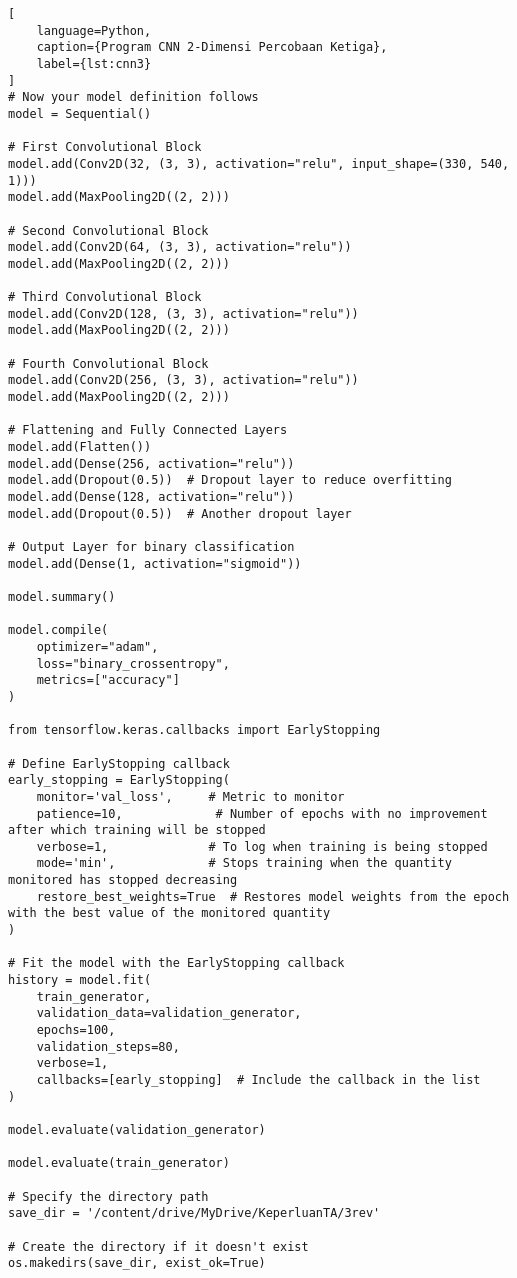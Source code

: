 \begin{lstlisting}[
    language=Python,
    caption={Program CNN 2-Dimensi Percobaan Ketiga},
    label={lst:cnn3}
]
# Now your model definition follows
model = Sequential()

# First Convolutional Block
model.add(Conv2D(32, (3, 3), activation="relu", input_shape=(330, 540, 1)))
model.add(MaxPooling2D((2, 2)))

# Second Convolutional Block
model.add(Conv2D(64, (3, 3), activation="relu"))
model.add(MaxPooling2D((2, 2)))

# Third Convolutional Block
model.add(Conv2D(128, (3, 3), activation="relu"))
model.add(MaxPooling2D((2, 2)))

# Fourth Convolutional Block
model.add(Conv2D(256, (3, 3), activation="relu"))
model.add(MaxPooling2D((2, 2)))

# Flattening and Fully Connected Layers
model.add(Flatten())
model.add(Dense(256, activation="relu"))
model.add(Dropout(0.5))  # Dropout layer to reduce overfitting
model.add(Dense(128, activation="relu"))
model.add(Dropout(0.5))  # Another dropout layer

# Output Layer for binary classification
model.add(Dense(1, activation="sigmoid"))

model.summary()

model.compile(
    optimizer="adam",
    loss="binary_crossentropy",
    metrics=["accuracy"]
)

from tensorflow.keras.callbacks import EarlyStopping

# Define EarlyStopping callback
early_stopping = EarlyStopping(
    monitor='val_loss',     # Metric to monitor
    patience=10,             # Number of epochs with no improvement after which training will be stopped
    verbose=1,              # To log when training is being stopped
    mode='min',             # Stops training when the quantity monitored has stopped decreasing
    restore_best_weights=True  # Restores model weights from the epoch with the best value of the monitored quantity
)

# Fit the model with the EarlyStopping callback
history = model.fit(
    train_generator,
    validation_data=validation_generator,
    epochs=100,
    validation_steps=80,
    verbose=1,
    callbacks=[early_stopping]  # Include the callback in the list
)

model.evaluate(validation_generator)

model.evaluate(train_generator)

# Specify the directory path
save_dir = '/content/drive/MyDrive/KeperluanTA/3rev'

# Create the directory if it doesn't exist
os.makedirs(save_dir, exist_ok=True)


\end{lstlisting}
